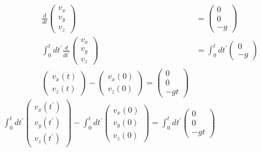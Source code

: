 $$
\begin{aligned}
\frac{d}{d t}\left(\begin{array}{c}
{v_{x}} \\
{v_{y}} \\
{v_{z}}
\end{array}\right) &=\left(\begin{array}{c}
{0} \\
{0} \\
{-g}
\end{array}\right) \\
\int_{0}^{t} d t^{\prime} \frac{d}{d t^{\prime}}\left(\begin{array}{c}
{v_{x}} \\
{v_{y}} \\
{v_{z}}
\end{array}\right) &=\int_{0}^{t} d t^{\prime}\left(\begin{array}{c}
{0} \\
{-g}
\end{array}\right) \\
\left(\begin{array}{c}
{v_{x}(t)} \\
{v_{z}(t)}
\end{array}\right)-\left(\begin{array}{c}
{v_{x}(0)} \\
{v_{z}(0)}
\end{array}\right)=\left(\begin{array}{c}
{0} \\
{0} \\
{-g t}
\end{array}\right)
\end{aligned}
$$
$\int_{0}^{t} d t^{\prime}\left(\begin{array}{l}{v_{x}\left(t^{\prime}\right)} \\ {v_{y}\left(t^{\prime}\right)} \\ {v_{z}\left(t^{\prime}\right)}\end{array}\right)-\int_{0}^{t} d t^{\prime}\left(\begin{array}{l}{v_{x}(0)} \\ {v_{y}(0)} \\ {v_{z}(0)}\end{array}\right)=\int_{0}^{t} d t^{\prime}\left(\begin{array}{c}{0} \\ {0} \\ {-g t}\end{array}\right)$
